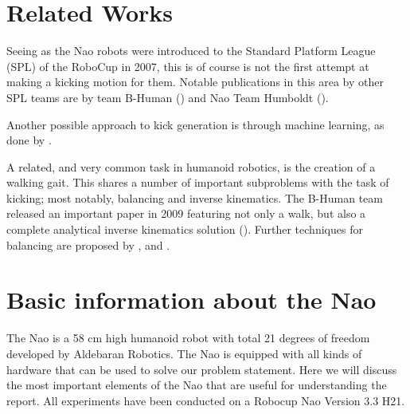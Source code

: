 \documentclass[a4paper]{article}
\begin{document}
\section{Related Works}
Seeing as the Nao robots were introduced to the Standard Platform League (SPL)
of the RoboCup in 2007, this is of course is not the first attempt at making a
kicking motion for them. Notable publications in this area by other SPL teams
are by team B-Human (\cite{Muller2011}) and Nao Team Humboldt (\cite{Xu2010}).

Another possible approach to kick generation is through machine learning, as
done by \cite{Meijer2012}.

A related, and very common task in humanoid robotics, is the creation of a
walking gait. This shares a number of important subproblems with the task of
kicking; most notably, balancing and inverse kinematics. The B-Human team
released an important paper in 2009 featuring not only a walk, but also a
complete analytical inverse kinematics solution (\cite{Graf2009}). Further
techniques for balancing are proposed by \cite{Strom2010}, \cite{Graf2010} and
\cite{Alcaraz-Jimenez2012}.

\section{Basic information about the Nao}
The Nao is a 58 cm high humanoid robot with total 21 degrees of freedom developed by Aldebaran Robotics. The Nao
is equipped with all kinds of hardware that can be used to solve our problem
statement. Here we will discuss the most
important elements of the Nao that are useful for understanding the report. All
experiments have been conducted on a Robocup Nao Version 3.3 H21.
\end{document}
